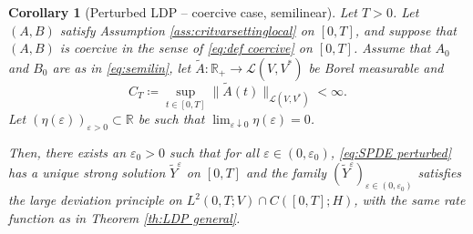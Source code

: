 \documentclass{amsart}
\newcommand{\<}{\langle}
\newcommand{\?}{\rangle}
\newcommand{\ceqq}{\coloneqq}
\newcommand{\col}{\colon}
\theoremstyle{plain}
\theoremstyle{remark}
\theoremstyle{plain}
\newtheorem{corollary}[theorem]{Corollary}
\numberwithin{equation}{section}
\def\R{{\mathbb R}}
\newcommand{\eps}{\varepsilon}
\begin{document}
\begin{corollary}[Perturbed LDP -- coercive case, semilinear]\label{cor:LDPcoerciveperturbed}
  Let $T>0$. Let $(A,B)$ satisfy Assumption \ref{ass:critvarsettinglocal} on $[0,T]$, and suppose that $(A,B)$ is coercive in the sense of \eqref{eq:def coercive} on $[0,T]$.  
  Assume that $A_0$ and $B_0$ are as in \eqref{eq:semilin}, let $\tilde{A}\col \R_+ \to \mathscr{L}(V,V^*)$ be  Borel measurable and   
  $$
  C_T\ceqq \sup_{t\in[0,T]}\|\tilde{A}(t)\|_{\mathscr{L}(V,V^*)}<\infty.  
  $$
  Let $(\eta(\eps))_{\eps>0}\subset \R$ be such that  $\lim_{\eps\downarrow0}\eta(\eps)=0$. 
  
  Then, there exists an $\eps_0>0$ such that for all $\eps\in(0,\eps_0)$, \eqref{eq:SPDE perturbed} has a unique strong solution $\tilde{Y}^\eps$ on $[0,T]$ and the family $(\tilde{Y}^\eps)_{\eps\in(0,\eps_0)}$ 
    satisfies the large deviation principle on $L^2(0,T;V)\cap C([0,T];H)$, with the same rate function as in Theorem \ref{th:LDP general}. 
\end{corollary} 
\end{document}
